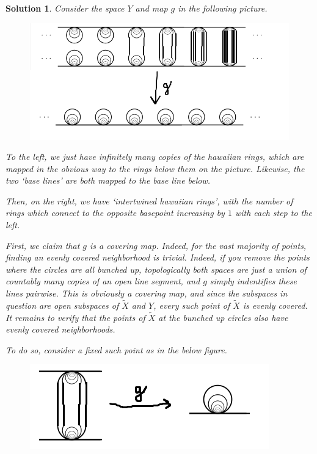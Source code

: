\documentclass{article}
\theoremstyle{plain}
\theoremstyle{nonumberplain}
\newtheorem{sol}{Solution}
\begin{document}
\begin{sol}
Consider the space $Y$ and map $g$ in the following picture.
\begin{figure}[H]
\centering
\includegraphics[width=\linewidth]{rings1}
\end{figure}

To the left, we just have infinitely many copies of the hawaiian rings, which are mapped in the obvious way to the rings below them on the picture. Likewise, the two `base lines' are both mapped to the base line below.

Then, on the right, we have `intertwined hawaiian rings', with the number of rings which connect to the opposite basepoint increasing by $1$ with each step to the left.

First, we claim that $g$ is a covering map. Indeed, for the vast majority of points, finding an evenly covered neighborhood is trivial. Indeed, if you remove the points where the circles are all bunched up, topologically both spaces are just a union of countably many copies of an open line segment, and $g$ simply indentifies these lines pairwise. This is obviously a covering map, and since the subspaces in question are open subspaces of $\tilde X$ and $Y$, every such point of $\tilde X$ is evenly covered. It remains to verify that the points of $\tilde X$ at the bunched up circles also have evenly covered neighborhoods.

To do so, consider a fixed such point as in the below figure.
\begin{figure}[H]
\centering
\includegraphics[width=0.7\linewidth]{rings2}
\end{figure}


\end{sol}
\end{document}
